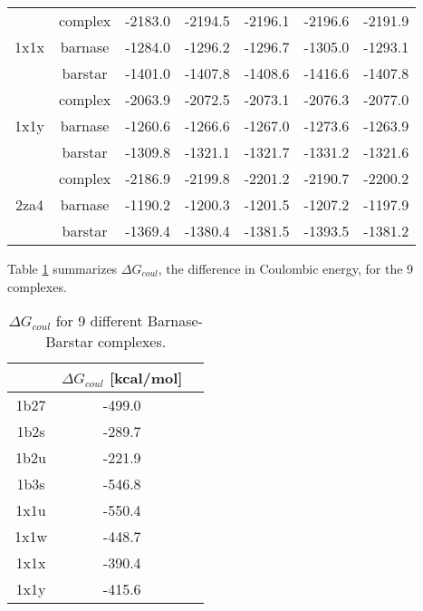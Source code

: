 \documentclass[11pt]{article}
\begin{document}
\begin{table*}[]
\begin{tabular}{cc|c|c|c|c|c}
     \multirow{3}{*}{1x1x} & complex & -2183.0 & -2194.5 & -2196.1 & -2196.6 & -2191.9 \\
                           & barnase & -1284.0 & -1296.2 & -1296.7 & -1305.0 & -1293.1 \\
                           & barstar & -1401.0 & -1407.8 & -1408.6 & -1416.6 & -1407.8 \\ \hline
     \multirow{3}{*}{1x1y} & complex & -2063.9 & -2072.5 & -2073.1 & -2076.3 & -2077.0 \\
                           & barnase & -1260.6 & -1266.6 & -1267.0 & -1273.6 & -1263.9 \\
                           & barstar & -1309.8 & -1321.1 & -1321.7 & -1331.2 & -1321.6 \\ \hline
     \multirow{3}{*}{2za4} & complex & -2186.9 & -2199.8 & -2201.2 & -2190.7 & -2200.2 \\
                           & barnase & -1190.2 & -1200.3 & -1201.5 & -1207.2 & -1197.9 \\
                           & barstar & -1369.4 & -1380.4 & -1381.5 & -1393.5 & -1381.2
     \end{tabular}
     \caption{Solvation energies of 9 Barnase-Barstar complexes and their components, using various PB solvers.
     Energies are in units of kcal/mol.
     \label{tab:solv_bind}
     }
\end{table*}

 Table \ref{tab:coul_bind} summarizes $\Delta G_{coul}$, the difference in Coulombic energy, for the 9 complexes.

\begin{table}[]
     \centering
     \begin{tabular}{c|cc}
          & $\Delta G_{coul}$ [kcal/mol] &  \\ \hline
     1b27 & -499.0       &  \\
     1b2s & -289.7       &  \\
     1b2u & -221.9       &  \\
     1b3s & -546.8       &  \\
     1x1u & -550.4       &  \\
     1x1w & -448.7       &  \\
     1x1x & -390.4       &  \\
     1x1y & -415.6       & 
     \end{tabular}
     \caption{$\Delta G_{coul}$ for 9 different Barnase-Barstar complexes.}
     \label{tab:coul_bind}
\end{table}     

{}

\end{document}
